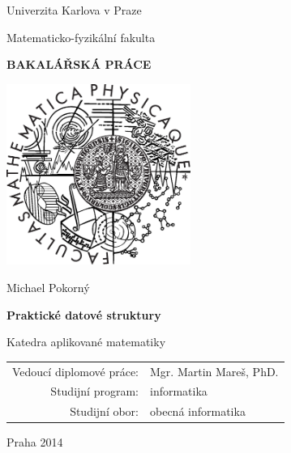 \pagestyle{empty}
\begin{center}

\large

Univerzita Karlova v Praze

\medskip

Matematicko-fyzikální fakulta

\vfill

{\bf\Large BAKALÁŘSKÁ PRÁCE}

\vfill

\centerline{\mbox{\includegraphics[width=60mm]{img/logo.eps}}}

\vfill
\vspace{5mm}

{\LARGE Michael Pokorný}

\vspace{15mm}

{\LARGE\bfseries Praktické datové struktury}

\vfill

Katedra aplikované matematiky

\vfill

\begin{tabular}{rl}

Vedoucí diplomové práce: & Mgr. Martin Mareš, PhD.\\
\noalign{\vspace{2mm}}
Studijní program: & informatika \\
\noalign{\vspace{2mm}}
Studijní obor: & obecná informatika \\
\end{tabular}

\vfill

Praha 2014

\end{center}

